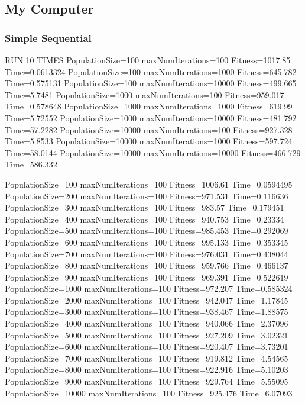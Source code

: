 \documentclass[10pt,letterpaper]{article}
\begin{document}
\subsection{My Computer}
\subsubsection{Simple Sequential} 
RUN 10 TIMES 
PopulationSize=100 maxNumIterations=100 Fitness=1017.85 Time=0.0613324
PopulationSize=100 maxNumIterations=1000 Fitness=645.782 Time=0.575131
PopulationSize=100 maxNumIterations=10000 Fitness=499.665 Time=5.7481
PopulationSize=1000 maxNumIterations=100 Fitness=959.017 Time=0.578648
PopulationSize=1000 maxNumIterations=1000 Fitness=619.99 Time=5.72552
PopulationSize=1000 maxNumIterations=10000 Fitness=481.792 Time=57.2282
PopulationSize=10000 maxNumIterations=100 Fitness=927.328 Time=5.8533
PopulationSize=10000 maxNumIterations=1000 Fitness=597.724 Time=58.0144
PopulationSize=10000 maxNumIterations=10000 Fitness=466.729 Time=586.332


PopulationSize=100 maxNumIterations=100 Fitness=1006.61 Time=0.0594495
PopulationSize=200 maxNumIterations=100 Fitness=971.531 Time=0.116636
PopulationSize=300 maxNumIterations=100 Fitness=983.57 Time=0.179451
PopulationSize=400 maxNumIterations=100 Fitness=940.753 Time=0.23334
PopulationSize=500 maxNumIterations=100 Fitness=985.453 Time=0.292069
PopulationSize=600 maxNumIterations=100 Fitness=995.133 Time=0.353345
PopulationSize=700 maxNumIterations=100 Fitness=976.031 Time=0.438044
PopulationSize=800 maxNumIterations=100 Fitness=959.766 Time=0.466137
PopulationSize=900 maxNumIterations=100 Fitness=969.391 Time=0.522619
PopulationSize=1000 maxNumIterations=100 Fitness=972.207 Time=0.585324
PopulationSize=2000 maxNumIterations=100 Fitness=942.047 Time=1.17845
PopulationSize=3000 maxNumIterations=100 Fitness=938.467 Time=1.88575
PopulationSize=4000 maxNumIterations=100 Fitness=940.066 Time=2.37096
PopulationSize=5000 maxNumIterations=100 Fitness=927.209 Time=3.02321
PopulationSize=6000 maxNumIterations=100 Fitness=920.407 Time=3.73201
PopulationSize=7000 maxNumIterations=100 Fitness=919.812 Time=4.54565
PopulationSize=8000 maxNumIterations=100 Fitness=922.916 Time=5.10203
PopulationSize=9000 maxNumIterations=100 Fitness=929.764 Time=5.55095
PopulationSize=10000 maxNumIterations=100 Fitness=925.476 Time=6.07093
\end{document}
